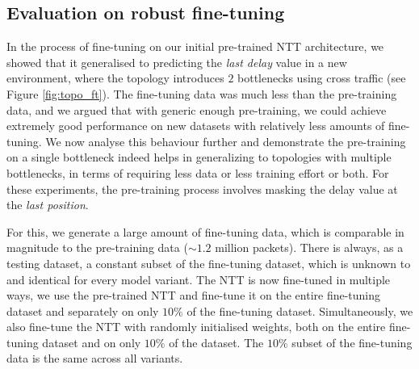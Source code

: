 \subsection{Evaluation on robust fine-tuning}
\label{ssec:robeval}

In the process of fine-tuning on our initial pre-trained NTT architecture, we showed that it generalised to predicting the \emph{last delay} value in a new environment, where the topology introduces $2$ bottlenecks using cross traffic (see Figure \ref{fig:topo_ft}). The fine-tuning data was much less than the pre-training data, and we argued that with generic enough pre-training, we could achieve extremely good performance on new datasets with relatively less amounts of fine-tuning. We now analyse this behaviour further and demonstrate the pre-training on a single bottleneck indeed helps in generalizing to topologies with multiple bottlenecks, in terms of requiring less data or less training effort or both. For these experiments, the pre-training process involves masking the delay value at the \emph{last position}.

For this, we generate a large amount of fine-tuning data, which is comparable in magnitude to the pre-training data (${\sim}1.2$ million packets). There is always, as a testing dataset, a constant subset of the fine-tuning dataset, which is unknown to and identical for every model variant. The NTT is now fine-tuned in multiple ways, we use the pre-trained NTT and fine-tune it on the entire fine-tuning dataset and separately on only $10\%$ of the fine-tuning dataset. Simultaneously, we also fine-tune the NTT with randomly initialised weights, both on the entire fine-tuning dataset and on only $10\%$ of the dataset. The $10\%$ subset of the fine-tuning data is the same across all variants. 

